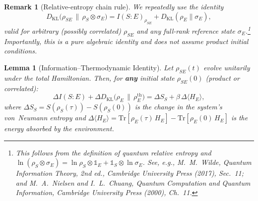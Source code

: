 \documentclass[12pt,a4paper,openany]{book}
\newtheorem{lemma}[theorem]{Lemma}
\newtheorem{remark}[theorem]{Remark}
\begin{document}
\begin{remark}[Relative-entropy chain rule]
\label{I-rem:chain_rule}
We repeatedly use the identity
\begin{equation}
\label{I-eq:chain_general}
D_{\mathrm{KL}}\!\bigl(\rho_{SE}\,\big\|\,
  \rho_S\otimes\sigma_E\bigr)
= I(S{:}E)_{\rho_{SE}}
  + D_{\mathrm{KL}}(\rho_E\|\sigma_E),
\end{equation}
valid for \emph{arbitrary} (possibly correlated)
$\rho_{SE}$ and any full-rank reference state
$\sigma_E$.\footnote{This follows from the definition of
quantum relative entropy and
$\ln(\rho_S\otimes\sigma_E)
= \ln\rho_S\otimes\mathbb{1}_E
  +\mathbb{1}_S\otimes\ln\sigma_E$.
See, e.g., M.~M.~Wilde, \emph{Quantum Information
Theory}, 2nd ed., Cambridge University Press (2017),
Sec.~11; and M.~A.~Nielsen and I.~L.~Chuang,
\emph{Quantum Computation and Quantum Information},
Cambridge University Press (2000), Ch.~11.}
Importantly, this is a \emph{pure algebraic identity} and
does not assume product initial conditions.
\end{remark}

\begin{lemma}[Information--Thermodynamic Identity]
\label{I-lem:info_thermo}
Let $\rho_{SE}(t)$ evolve unitarily under the total
Hamiltonian.
Then, for \textbf{any} initial state $\rho_{SE}(0)$
(product or correlated):
\begin{equation}
\label{I-eq:info_thermo}
\Delta I(S{:}E)
+ \Delta D_{\mathrm{KL}}\!\bigl(\rho_E \,\big\|\,
  \rho_E^{\mathrm{th}}\bigr)
= \Delta S_S + \beta\,\Delta\langle H_E \rangle,
\end{equation}
where $\Delta S_S = S(\rho_S(\tau)) - S(\rho_S(0))$ is the
change in the system's von~Neumann entropy and
$\Delta\langle H_E \rangle
= \mathrm{Tr}[\rho_E(\tau)\, H_E]
  - \mathrm{Tr}[\rho_E(0)\, H_E]$
is the energy absorbed by the environment.
\end{lemma}
\end{document}
